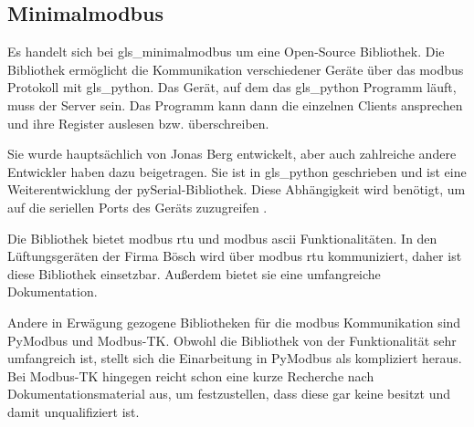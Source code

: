 \subsection{Minimalmodbus} \label{minimalmodbus}
Es handelt sich bei \gls{gls_minimalmodbus} um eine Open-Source Bibliothek. Die Bibliothek ermöglicht die Kommunikation verschiedener Geräte über das \gls{modbus} Protokoll mit \gls{gls_python}. Das Gerät, auf dem das \gls{gls_python} Programm läuft, muss der Server sein. Das Programm kann dann die einzelnen Clients ansprechen und ihre Register auslesen bzw. überschreiben.

Sie wurde hauptsächlich von Jonas Berg entwickelt, aber auch zahlreiche andere Entwickler haben dazu beigetragen. Sie ist in \gls{gls_python} geschrieben und ist eine Weiterentwicklung der pySerial-Bibliothek. Diese Abhängigkeit wird benötigt, um auf die seriellen Ports des Geräts zuzugreifen \cite{Liechti_pySerial:o.J.}. 

Die Bibliothek bietet \gls{modbus} \acs{rtu} und \gls{modbus} \acs{ascii} Funktionalitäten. In den Lüftungsgeräten der Firma Bösch wird über \gls{modbus} \acs{rtu} kommuniziert, daher ist diese Bibliothek einsetzbar. Außerdem bietet sie eine umfangreiche Dokumentation.
\cite{Berg_MiniModbus:2023, Berg_MiniModbus_Git:2023} 

Andere in Erwägung gezogene Bibliotheken für die \gls{modbus} Kommunikation sind PyModbus und Modbus-TK. Obwohl die Bibliothek von der Funktionalität sehr umfangreich ist, stellt sich die Einarbeitung in PyModbus als kompliziert heraus. Bei Modbus-TK hingegen reicht schon eine kurze Recherche nach Dokumentationsmaterial aus, um festzustellen, dass diese gar keine besitzt und damit unqualifiziert ist.